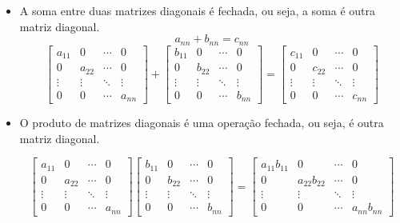 \documentclass[a4paper,12pt]{article}
\begin{document}
\begin{itemize}

    \item A soma entre duas matrizes diagonais é fechada, ou seja, a soma é outra matriz diagonal.
    $$ a_{nn} + b_{nn} = c_{nn} $$
    $$ \begin{bmatrix}
 a_{11} & 0 &  \cdots & 0 \\
 0 & a_{22} &  \cdots & 0 \\
 \vdots & \vdots & \ddots & \vdots  \\ 
0 & 0  & \cdots & a_{nn}
 \end{bmatrix} + \begin{bmatrix}
 b_{11} & 0 &  \cdots & 0 \\
 0 & b_{22} &  \cdots & 0 \\
 \vdots & \vdots & \ddots & \vdots  \\ 
0 & 0  & \cdots & b_{nn}
 \end{bmatrix} = \begin{bmatrix}
 c_{11} & 0 &  \cdots & 0 \\
 0 & c_{22} &  \cdots & 0 \\
 \vdots & \vdots & \ddots & \vdots  \\ 
0 & 0  & \cdots & c_{nn}
 \end{bmatrix}$$
 
    \item O produto de matrizes diagonais é uma operação fechada, ou seja, é outra matriz diagonal.
    
    $$ \begin{bmatrix}
 a_{11} & 0 &  \cdots & 0 \\
 0 & a_{22} &  \cdots & 0 \\
 \vdots & \vdots & \ddots & \vdots  \\ 
0 & 0  & \cdots & a_{nn}
 \end{bmatrix} \begin{bmatrix}
 b_{11} & 0 &  \cdots & 0 \\
 0 & b_{22} &  \cdots & 0 \\
 \vdots & \vdots & \ddots & \vdots  \\ 
0 & 0  & \cdots & b_{nn}
 \end{bmatrix} = \begin{bmatrix}
 a_{11} b_{11} & 0 &  \cdots & 0 \\
 0 & a_{22} b_{22} &  \cdots & 0 \\
 \vdots & \vdots & \ddots & \vdots  \\ 
0 & 0  & \cdots & a_{nn} b_{nn}
 \end{bmatrix} $$
    

\end{itemize}
\end{document}

